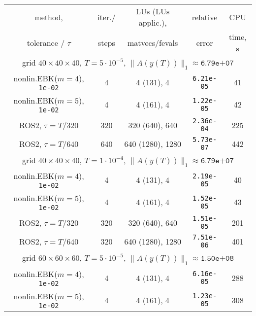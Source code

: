 \documentclass[sn-aps]{sn-jnl}
\theoremstyle{thmstyleone}%
\theoremstyle{thmstyletwo}%
\theoremstyle{thmstylethree}%
\begin{document}
\begin{table}
\renewcommand{\arraystretch}{1.1} %
\begin{tabular}{ccccc}
\hline\hline
 method,             & iter./ & LUs (LUs applic.), & relative & CPU \\ 
 tolerance / $\tau$  & steps  & matvecs/fevals     & error    & time, s\\
\hline
\multicolumn{5}{c}{grid $40\times 40\times 40$, $T=5\cdot 10^{-5}$, $\|A(y(T))\|_1\approx\texttt{6.79e+07}$}\\
nonlin.EBK($m=4$), {\tt1e-02} &   4   &  4 (131), 4 & {\tt6.21e-05}  & 41 \\                
nonlin.EBK($m=5$), {\tt1e-02} &   4   &  4 (161), 4 & {\tt1.22e-05}  & 42 \\
ROS2, $\tau = T/320$ & 320   & 320 (640), 640 & {\tt2.36e-04}  & 225 \\
ROS2, $\tau = T/640$ & 640   & 640 (1280), 1280 & {\tt5.73e-07}  & 442
%
%
%
\\\hline
\multicolumn{5}{c}{grid $40\times 40\times 40$, $T=1\cdot 10^{-4}$, $\|A(y(T))\|_1\approx\texttt{6.79e+07}$}\\
%
nonlin.EBK($m=4$), {\tt1e-02} & 4   & 4 (131), 4  & {\tt2.19e-05} & 40 \\
nonlin.EBK($m=5$), {\tt1e-02} & 4   & 4 (161), 4  & {\tt1.52e-05} & 43 \\
ROS2, $\tau = T/320$              & 320 &  320 (640), 640 & {\tt1.51e-05}  & 201 \\
ROS2, $\tau = T/640$              & 320 & 640 (1280), 1280 & {\tt7.51e-06}  & 401
\\\hline
\multicolumn{5}{c}{grid $60\times 60\times 60$, $T=5\cdot 10^{-5}$, $\|A(y(T))\|_1\approx\texttt{1.50e+08}$}\\
% 
nonlin.EBK($m=4$), {\tt1e-02} & 4   & 4 (131), 4  & {\tt6.16e-05} & 288 \\
nonlin.EBK($m=5$), {\tt1e-02} & 4   & 4 (161), 4  & {\tt1.23e-05} & 308 \\

\end{tabular}
\end{table}
\end{document}
